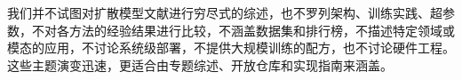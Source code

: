 我们并不试图对扩散模型文献进行穷尽式的综述，也不罗列架构、训练实践、超参数，不对各方法的经验结果进行比较，不涵盖数据集和排行榜，不描述特定领域或模态的应用，不讨论系统级部署，不提供大规模训练的配方，也不讨论硬件工程。这些主题演变迅速，更适合由专题综述、开放仓库和实现指南来涵盖。









